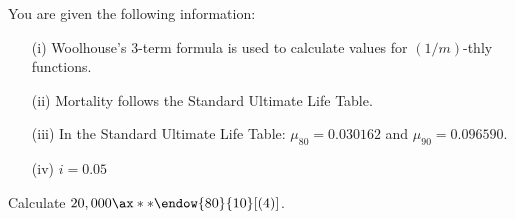 You are given the following information:
\begin{itemize}
\item[(i)] Woolhouse's 3-term formula is used to calculate values for $(1/m)$-thly
functions.
\item[(ii)] Mortality follows the Standard Ultimate Life Table.
\item[(iii)] In the Standard Ultimate Life Table:
$\mu_{80} = 0.030162$ and $\mu_{90} = 0.096590$.   
\item[(iv)] $i = 0.05$
\end{itemize}
Calculate $20,000\ax**{\endow{80}{10}}[(4)]$.

